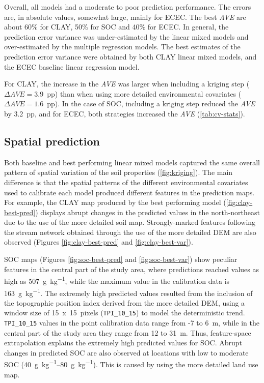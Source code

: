 

Overall, all models had a moderate to poor prediction performance. The errors are, in absolute values, somewhat 
large, mainly for ECEC. The best \textit{AVE} are about 60\% for CLAY, 50\% for SOC and 40\% for ECEC. In 
general, the prediction error variance was under-estimated by the linear mixed models and over-estimated by the 
multiple regression models. The best estimates of the prediction error variance were obtained by both CLAY 
linear mixed models, and the ECEC baseline linear regression model.

For CLAY, the increase in the \textit{AVE} was larger when including a kriging step 
($\Delta\textit{AVE}=3.9$~pp) than when using more detailed environmental covariates 
($\Delta\textit{AVE}=1.6$~pp). In the case of SOC, including a kriging step reduced the \textit{AVE} by 3.2~pp, 
and for ECEC, both strategies increased the \textit{AVE} (\autoref{tab:cv-stats}).

\subsection{Spatial prediction}

Both baseline and best performing linear mixed models captured the same overall pattern of spatial variation of 
the soil properties (\autoref{fig:kriging}). The main difference is that the spatial patterns of the different 
environmental covariates used to calibrate each model produced different features in the prediction maps. For 
example, the CLAY map produced by the best performing model (\autoref{fig:clay-best-pred}) displays abrupt 
changes in the predicted values in the north-northeast due to the use of the more detailed soil map. 
Strongly-marked features following the stream network obtained through the use of the more detailed DEM are 
also observed (Figures \ref{fig:clay-best-pred} and \ref{fig:clay-best-var}).

SOC maps (Figures \ref{fig:soc-best-pred} and \ref{fig:soc-best-var}) show peculiar features in the central 
part of the study area, where predictions reached values as high as \SI{507}{\gram\per\kilo\gram}, while 
the maximum value in the calibration data is \SI{163}{\gram\per\kilo\gram}. The extremely high predicted 
values resulted from the inclusion of the topographic position index derived from the more detailed DEM, using 
a window size of 15~x~15~pixels (\texttt{TPI\_10\_15}) to model the deterministic trend. \texttt{TPI\_10\_15} 
values in the point calibration data range from -7 to 6~m, while in the central part of the study area they 
range from 12 to 31~m. Thus, feature-space extrapolation explains the extremely high predicted values for SOC. 
Abrupt changes in predicted SOC are also observed at locations with low to moderate SOC 
(\SIrange{40}{80}{\gram\per\kilo\gram}). This is caused by using the more detailed land use map.

